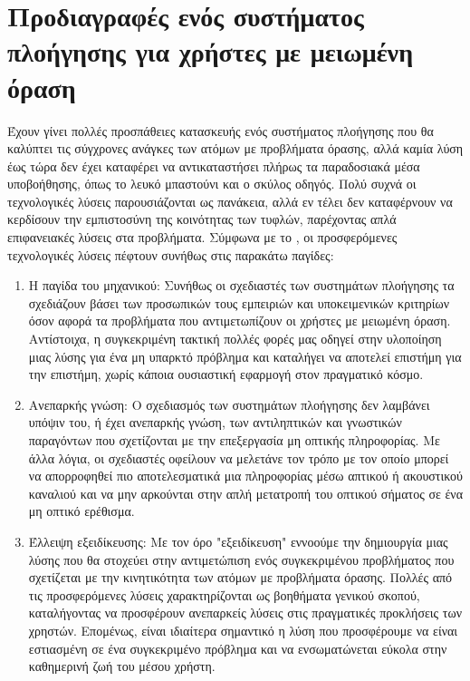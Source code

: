 \section{Προδιαγραφές ενός συστήματος πλοήγησης για χρήστες με μειωμένη όραση}
Έχουν γίνει πολλές προσπάθειες κατασκευής ενός συστήματος πλοήγησης που θα καλύπτει τις σύγχρονες ανάγκες των ατόμων με προβλήματα όρασης, αλλά καμία λύση έως τώρα δεν έχει καταφέρει να αντικαταστήσει πλήρως τα παραδοσιακά μέσα υποβοήθησης, όπως το λευκό μπαστούνι και ο σκύλος οδηγός. Πολύ συχνά οι τεχνολογικές λύσεις παρουσιάζονται ως πανάκεια, αλλά εν τέλει δεν καταφέρνουν να κερδίσουν την εμπιστοσύνη της κοινότητας των τυφλών, παρέχοντας απλά επιφανειακές λύσεις στα προβλήματα. Σύμφωνα με το \cite{giudice2018navigating}, οι προσφερόμενες τεχνολογικές λύσεις πέφτουν συνήθως στις παρακάτω παγίδες:
\begin{enumerate}
    \item Η παγίδα του μηχανικού: Συνήθως οι σχεδιαστές των συστημάτων πλοήγησης τα σχεδιάζουν βάσει των προσωπικών τους εμπειριών και υποκειμενικών κριτηρίων όσον αφορά τα προβλήματα που αντιμετωπίζουν οι χρήστες με μειωμένη όραση. Αντίστοιχα, η συγκεκριμένη τακτική πολλές φορές μας οδηγεί στην υλοποίηση μιας λύσης για ένα μη υπαρκτό πρόβλημα και καταλήγει να αποτελεί επιστήμη για την επιστήμη, χωρίς κάποια ουσιαστική εφαρμογή στον πραγματικό κόσμο.
    \item Ανεπαρκής γνώση: Ο σχεδιασμός των συστημάτων πλοήγησης δεν λαμβάνει υπόψιν του, ή έχει ανεπαρκής γνώση, των αντιληπτικών και γνωστικών παραγόντων που σχετίζονται με την επεξεργασία μη οπτικής πληροφορίας. Με άλλα λόγια, οι σχεδιαστές οφείλουν να μελετάνε τον τρόπο με τον οποίο μπορεί να απορροφηθεί πιο αποτελεσματικά μια πληροφορίας μέσω απτικού ή ακουστικού καναλιού και να μην αρκούνται στην απλή μετατροπή του οπτικού σήματος σε ένα μη οπτικό ερέθισμα.
    \item Έλλειψη εξειδίκευσης: Με τον όρο "εξειδίκευση" εννοούμε την δημιουργία μιας λύσης που θα στοχεύει στην αντιμετώπιση ενός συγκεκριμένου προβλήματος που σχετίζεται με την κινητικότητα των ατόμων με προβλήματα όρασης. Πολλές από τις προσφερόμενες λύσεις χαρακτηρίζονται ως βοηθήματα γενικού σκοπού, καταλήγοντας να προσφέρουν ανεπαρκείς λύσεις στις πραγματικές προκλήσεις των χρηστών. Επομένως, είναι ιδιαίτερα σημαντικό η λύση που προσφέρουμε να είναι εστιασμένη σε ένα συγκεκριμένο πρόβλημα και να ενσωματώνεται εύκολα στην καθημερινή ζωή του μέσου χρήστη.
\end{enumerate}

